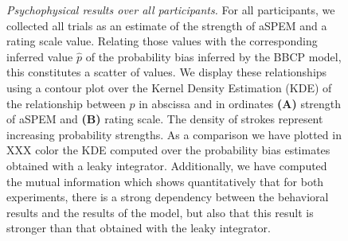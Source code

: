 \documentclass[12pt,english]{article}%
\newcommand{\seeFig}[1]{Figure~\ref{fig:#1}}
\begin{document}
\begin{figure}%
\caption{%
\emph{Psychophysical results over all participants.} %
For all participants, we collected all trials as an estimate of
the strength of aSPEM and a rating scale value.
Relating those values with the corresponding inferred value $\hat{p}$
of the probability bias inferred by the BBCP model,
this constitutes a scatter of values.
We display these relationships using a contour plot over 
the Kernel Density Estimation (KDE) of the relationship between $p$ in abscissa
and in ordinates \textbf{(A)} strength of aSPEM and \textbf{(B)} rating scale.
The density of strokes represent increasing probability strengths.
As a comparison we have plotted in XXX color the KDE computed over
the probability bias estimates obtained with a leaky integrator.
Additionally, we have computed the mutual information which
shows quantitatively that for both experiments, 
there is a strong dependency between 
the behavioral results and the results of the model, 
but also that this result is stronger than that obtained 
with the leaky integrator.
}
\label{fig:results_psycho_all}
\end{figure}
\end{document}
